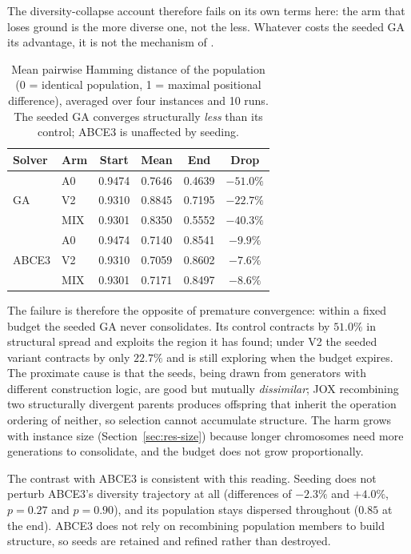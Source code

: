 \documentclass[review]{elsarticle}
\begin{document}
The diversity-collapse account therefore fails on its own terms here: the
arm that loses ground is the more diverse one, not the less. Whatever costs
the seeded GA its advantage, it is not the mechanism of \cite{Burke1998}.

\begin{table}[htbp]
\centering
\caption{Mean pairwise Hamming distance of the population (0 = identical
population, 1 = maximal positional difference), averaged over four
instances and 10 runs. The seeded GA converges structurally \emph{less}
than its control; ABCE3 is unaffected by seeding.}
\label{tab:hamming}
\begin{tabular}{llcccc}
\toprule
Solver & Arm & Start & Mean & End & Drop \\
\midrule
\multirow{3}{*}{GA}
 & A0  & 0.9474 & 0.7646 & 0.4639 & $-51.0\%$ \\
 & V2  & 0.9310 & 0.8845 & 0.7195 & $-22.7\%$ \\
 & MIX & 0.9301 & 0.8350 & 0.5552 & $-40.3\%$ \\
\midrule
\multirow{3}{*}{ABCE3}
 & A0  & 0.9474 & 0.7140 & 0.8541 & $-9.9\%$ \\
 & V2  & 0.9310 & 0.7059 & 0.8602 & $-7.6\%$ \\
 & MIX & 0.9301 & 0.7171 & 0.8497 & $-8.6\%$ \\
\bottomrule
\end{tabular}
\end{table}

The failure is therefore the opposite of premature convergence: within a
fixed budget the seeded GA never consolidates. Its control contracts by
$51.0\%$ in structural spread and exploits the region it has found; under
V2 the seeded variant contracts by only $22.7\%$ and is still exploring
when the budget expires. The proximate cause is that the seeds, being
drawn from generators with different construction logic, are good but
mutually \emph{dissimilar}; JOX recombining two structurally divergent
parents produces offspring that inherit the operation ordering of neither,
so selection cannot accumulate structure. The harm grows with instance size
(Section~\ref{sec:res-size}) because longer chromosomes need more
generations to consolidate, and the budget does not grow proportionally.

The contrast with ABCE3 is consistent with this reading. Seeding does not
perturb ABCE3's diversity trajectory at all (differences of $-2.3\%$ and
$+4.0\%$, $p=0.27$ and $p=0.90$), and its population stays dispersed
throughout ($0.85$ at the end). ABCE3 does not rely on recombining
population members to build structure, so seeds are retained and refined
rather than destroyed.
\end{document}
